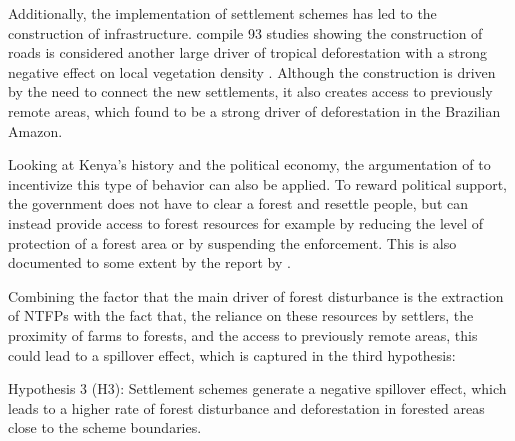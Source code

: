 Additionally, the implementation of settlement schemes has led to the construction of infrastructure.
\cite{geistProximateCausesUnderlying2002} compile 93 studies showing the construction of roads is considered another large driver of tropical deforestation with a strong negative effect on local vegetation density \parencite{pfaffWhatDrivesDeforestation1999}.
Although the construction is driven by the need to connect the new settlements, it also creates access to previously remote areas, which \cite{oliveiraLandUseAllocationProtects2007} found to be a strong driver of deforestation in the Brazilian Amazon.

Looking at Kenya's history and the political economy, the argumentation of \cite{sanfordDemocratizationElectionsPublic2023} to incentivize this type of behavior can also be applied.
To reward political support, the government does not have to clear a forest and resettle people, but can instead provide access to forest resources for example by reducing the level of protection of a forest area or by suspending the enforcement.
This is also documented to some extent by the report by \cite{ndunguReportComissionInquiry2004}.

Combining the factor that the main driver of forest disturbance is the extraction of NTFPs with the fact that, the reliance on these resources by settlers,
the proximity of farms to forests, and the access to previously remote areas, this could lead to a spillover effect, which is captured in the third hypothesis:

Hypothesis 3 (H3): Settlement schemes generate a negative spillover effect, which leads to a higher rate of forest disturbance and deforestation in forested areas close to the scheme boundaries.